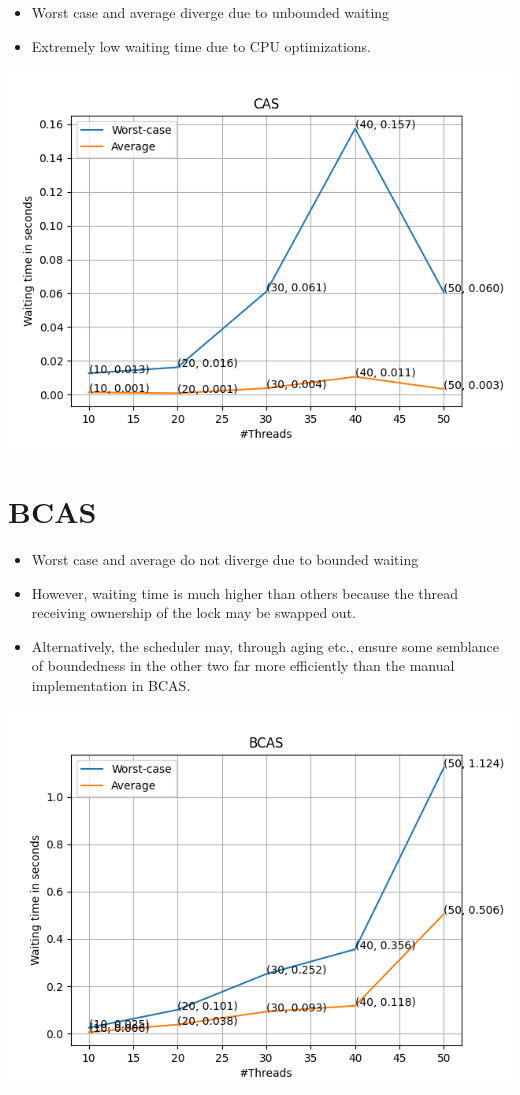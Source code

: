 \documentclass{amsart}
\begin{document}
\begin{itemize}
    \item Worst case and average diverge due to unbounded waiting
    \item Extremely low waiting time due to CPU optimizations.
\end{itemize}
\centering
\includegraphics[scale = 0.75]{cas.png}

\newpage

\section{BCAS} 

\begin{itemize}
    \item Worst case and average do not diverge due to bounded waiting
    \item However, waiting time is much higher than others because the thread receiving ownership of the lock may be swapped out.
    \item Alternatively, the scheduler may, through aging etc., ensure some semblance of boundedness in the other two far more efficiently than the manual implementation in BCAS.
\end{itemize}
\centering
\includegraphics[scale = 0.75]{bcas.png}
\end{document}
